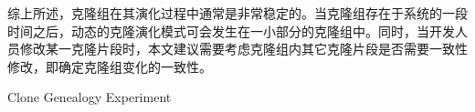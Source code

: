 
综上所述，克隆组在其演化过程中通常是非常稳定的。当克隆组存在于系统的一段时间之后，动态的克隆演化模式可会发生在一小部分的克隆组中。同时，当开发人员修改某一克隆片段时，本文建议需要考虑克隆组内其它克隆片段是否需要一致性修改，即确定克隆组变化的一致性。

{Clone Genealogy Experiment} 

